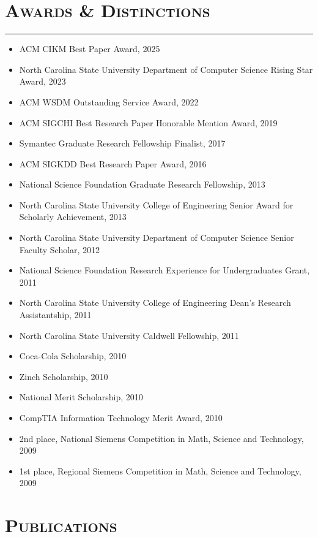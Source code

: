 \documentclass{article}
\newcommand{\HRule}{\rule{\linewidth}{0.5mm}}
\begin{document}
\section*{\bf \textsc{Awards \& Distinctions}}

\vspace{-5mm}\HRule

\begin{itemize}
\item ACM CIKM Best Paper Award, 2025
\item North Carolina State University Department of Computer Science Rising Star Award, 2023
\item ACM WSDM Outstanding Service Award, 2022
\item ACM SIGCHI Best Research Paper Honorable Mention Award, 2019
\item Symantec Graduate Research Fellowship Finalist, 2017
\item ACM SIGKDD Best Research Paper Award, 2016
\item National Science Foundation Graduate Research Fellowship, 2013
\item North Carolina State University College of Engineering Senior Award for Scholarly Achievement, 2013
\item North Carolina State University Department of Computer Science Senior Faculty Scholar, 2012
\item National Science Foundation Research Experience for Undergraduates Grant, 2011
\item North Carolina State University College of Engineering Dean's Research Assistantship, 2011
\item North Carolina State University Caldwell Fellowship, 2011
\item Coca-Cola Scholarship, 2010
\item Zinch Scholarship, 2010
\item National Merit Scholarship, 2010
\item CompTIA Information Technology Merit Award, 2010
\item 2nd place, National Siemens Competition in Math, Science and Technology, 2009
\item 1st place, Regional Siemens Competition in Math, Science and Technology, 2009
\end{itemize}

\section*{\bf \textsc{Publications}}
\end{document}
